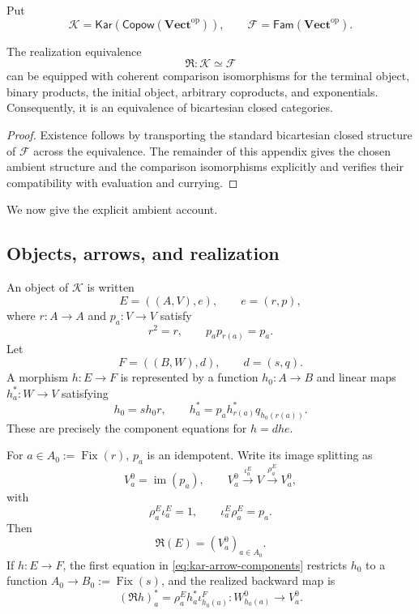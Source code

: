 \documentclass[runningheads,envcountsame]{llncs}
\newcommand{\Vectop}{\mathbf{Vect}^{\mathrm{op}}}
\newcommand{\Copow}{\mathsf{Copow}}
\newcommand{\Fam}{\mathsf{Fam}}
\newcommand{\Kar}{\mathsf{Kar}}
\newcommand{\Fix}{\operatorname{Fix}}
\newcommand{\im}{\operatorname{im}}
\newcommand{\Rlz}{\mathfrak R}
\begin{document}
Put
$$
\mathcal K=\Kar(\Copow(\Vectop)),
\qquad
\mathcal F=\Fam(\Vectop).
$$

\begin{theorem}
\label{thm:explicit-bcc-comparison}
The realization equivalence
$$
\Rlz:\mathcal K\simeq\mathcal F
$$
can be equipped with coherent comparison isomorphisms for the terminal object,
binary products, the initial object, arbitrary coproducts, and exponentials.
Consequently, it is an equivalence of bicartesian closed categories.
\end{theorem}

\begin{proof}
Existence follows by transporting the standard bicartesian closed structure of
$\mathcal F$ across the equivalence. The remainder of this appendix gives the
chosen ambient structure and the comparison isomorphisms explicitly and
verifies their compatibility with evaluation and currying.
\end{proof}


We now give the explicit ambient account.


\subsection{Objects, arrows, and realization}

An object of $\mathcal K$ is written
$$
E=((A,V),e),
\qquad
e=(r,p),
$$
where $r:A\to A$ and $p_a:V\to V$ satisfy
$$
r^2=r,
\qquad
p_a p_{r(a)}=p_a.
$$
Let
$$
F=((B,W),d),
\qquad
d=(s,q).
$$
A morphism $h:E\to F$ is represented by a function $h_0:A\to B$ and
linear maps $h_a^*:W\to V$ satisfying
\begin{equation}
h_0=s h_0 r,
\qquad
h_a^*=p_a h_{r(a)}^*q_{h_0(r(a))}.
\label{eq:kar-arrow-components}
\end{equation}
These are precisely the component equations for $h=dhe$.

For $a\in A_0:=\Fix(r)$, $p_a$ is an idempotent. Write its image splitting as
$$
V_a^0=\im(p_a),
\qquad
V_a^0\xrightarrow{\iota_a^E}V\xrightarrow{\rho_a^E}V_a^0,
$$
with
$$
\rho_a^E\iota_a^E=1,
\qquad
\iota_a^E\rho_a^E=p_a.
$$
Then
$$
\Rlz(E)=(V_a^0)_{a\in A_0}.
$$
If $h:E\to F$, the first equation in
\eqref{eq:kar-arrow-components} restricts $h_0$ to a function
$A_0\to B_0:=\Fix(s)$, and the realized backward map is
\begin{equation}
(\Rlz h)_a^*
=
\rho_a^E h_a^*\iota_{h_0(a)}^F:
W_{h_0(a)}^0\longrightarrow V_a^0.
\label{eq:realized-arrow-components}
\end{equation}
\end{document}
